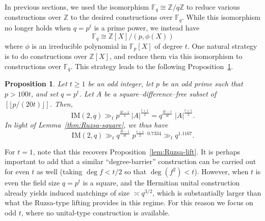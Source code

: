 \documentclass[12pt,reqno]{amsart}
\theoremstyle{plain}
\newtheorem{proposition}[theorem]{Proposition}
\theoremstyle{definition}
\newcommand{\F}{\mathbb{F}}
\newcommand{\Z}{\mathbb{Z}}
\newcommand{\IM}{\mathrm{IM}}
\newcommand{\1}{\mathbf{1}}
\begin{document}
In previous sections, we used the isomorphism $\F_q \cong \Z / q\Z$ to reduce various constructions over $\Z$ to the desired constructions over $\F_q$. While this isomorphism no longer holds when $q = p^t$ is a prime power, we instead have
$$\F_q \cong \Z[X] / (p, \phi(X))$$
where $\phi$ is an irreducible polynomial in $\F_p[X]$ of degree $t$. One natural strategy is to do constructions over $\Z[X]$, and reduce them via this isomorphism to constructions over $\F_q$. This strategy leads to the following Proposition~\ref{prop:ruzsa-lift-prime-power}.
\begin{proposition}
\label{prop:ruzsa-lift-prime-power}
Let $t\ge 1$ be an \emph{odd} integer, let $p$ be an odd prime such that $p >100t$, and set $q=p^t$. Let $A$ be a square--difference--free subset of $[\lfloor p/(20t)\rfloor]$.
Then, 
\[
  \IM(2,q) \gg_t p^{\frac{3t-1}{4}}\,|A|^{\frac{t+1}{2}} = q^{\frac{3t-1}{4t}}\;|A|^{\frac{t+1}{2}}.
\]
In light of Lemma~\ref{thm:Ruzsa-square}, we thus have
$$\IM(2,q) \gg_t q^{\frac{3t-1}{4t}}\; p^{\frac{t+1}{2} \cdot 0.7334} \gg_t q^{1.1167}.$$
\end{proposition}
For $t=1$, note that this recovers Proposition~\ref{lem:Ruzsa-lift}. It is perhaps important to add that a similar “degree-barrier” construction can be carried out for even $t$ as well (taking $\deg f < t/2$ so that $\deg(f^2)<t$).
However, when $t$ is even the field size $q=p^t$ is a square, and the Hermitian unital construction already yields induced matchings of size $\asymp q^{3/2}$, which is substantially larger than what the Ruzsa-type lifting provides in this regime. For this reason we focus on odd $t$, where no unital-type construction is available.
\end{document}
